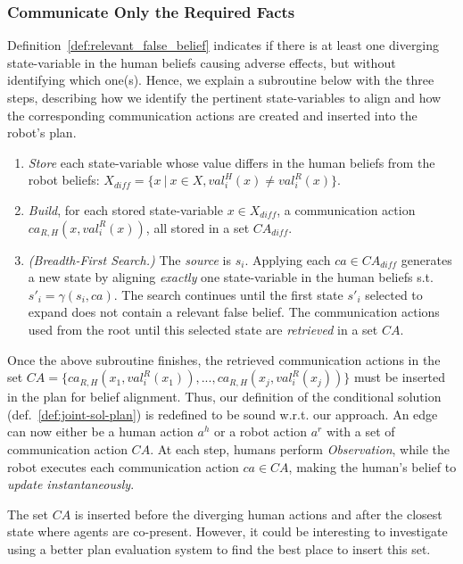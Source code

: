 \subsubsection{Communicate Only the Required Facts}
Definition~\ref{def:relevant_false_belief} indicates if there is at least one diverging state-variable in the human beliefs causing adverse effects, but without identifying which one(s).
Hence, we explain a subroutine below with the three steps, describing how we identify the pertinent state-variables to align and how the corresponding communication actions are created and inserted into the robot's plan.

\begin{enumerate}
    \item 
    \textit{Store} each state-variable whose value differs in the human beliefs from the robot beliefs: $X_{diff} = \{ x ~|~ x\in X, val^H_i(x) \neq val^R_i(x) \}$.

    \item
    \textit{Build}, for each stored state-variable $x \in X_{diff}$, a communication action $ca_{R, H}(x,val^R_i(x))$, all stored in a set $\mathit{CA}_{diff}$.

    \item 
    \textit{(Breadth-First Search.)} 
    The \textit{source} is $s_i$. Applying each $ca \in \mathit{CA}_{diff}$ generates a new state by aligning \textit{exactly} one state-variable in the human beliefs s.t. $s'_i = \gamma(s_i, ca )$. 
    The search continues until the first state $s'_i$ selected to expand does not contain a relevant false belief. The communication actions used from the root until this selected state are \textit{retrieved} in a set $\mathit{CA}$.
\end{enumerate}

Once the above subroutine finishes, the retrieved communication actions in the set $\mathit{CA} = \{ ca_{R, H}(x_1,val^R_i(x_1)),..., ca_{R, H}(x_j,val^R_i(x_j)) \}$ must be inserted in the plan for belief alignment. 
Thus, our definition of the conditional solution (def.~\ref{def:joint-sol-plan}) is redefined to be sound w.r.t. our approach. An edge can now either be a human action $a^h$ or a robot action $a^r$ with a set of communication action $CA$.
At each step, humans perform \textit{Observation}, while the robot executes each communication action $ca \in \mathit{CA}$, making the human's belief to \textit{update instantaneously}.

The set $\mathit{CA}$ is inserted before the diverging human actions and after the closest state where agents are co-present. 
However, it could be interesting to investigate using a better plan evaluation system to find the best place to insert this set.

